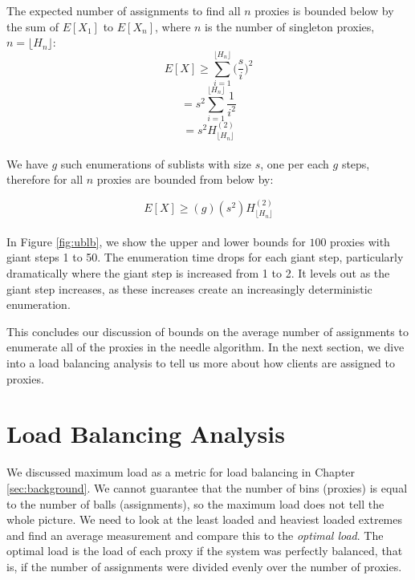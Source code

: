 The expected number of assignments to find all $n$ proxies is bounded below by the sum of $E[X_1]$ to $E[X_n]$, where $n$ is the number of singleton proxies, $n=\lfloor{H_n}\rfloor$:\\

$$E[X] \geq \sum_{i=1}^{\lfloor{H_n}\rfloor} \bigg(\frac{s}{i}\bigg)^2$$
$$= s^2 \sum_{i=1}^{\lfloor{H_n}\rfloor} \frac{1}{i^2}$$
$$= s^2H^{(2)}_{\lfloor{H_n}\rfloor}$$\\

We have $g$ such enumerations of sublists with size $s$, one per each $g$ steps, therefore for all $n$ proxies are bounded from below by:

$$E[X] \geq (g)(s^2)H^{(2)}_{\lfloor{H_n}\rfloor}$$\\

In Figure \ref{fig:ublb}, we show the upper and lower bounds for $100$ proxies with giant steps 1 to 50. The enumeration time drops for each giant step, particularly dramatically where the giant step is increased from 1 to 2. It levels out as the giant step increases, as these increases create an increasingly deterministic enumeration. 

This concludes our discussion of bounds on the average number of assignments to enumerate all of the proxies in the needle algorithm. In the next section, we dive into a load balancing analysis to tell us more about how clients are assigned to proxies.

\label{sec:lb}
\section{Load Balancing Analysis}

We discussed maximum load as a metric for load balancing in Chapter \ref{sec:background}. We cannot guarantee that the number of bins (proxies) is equal to the number of balls (assignments), so the maximum load does not tell the whole picture. We need to look at the least loaded and heaviest loaded extremes and find an average measurement and compare this to the \textit{optimal load}. The optimal load is the load of each proxy if the system was perfectly balanced, that is, if the number of assignments were divided evenly over the number of proxies.

